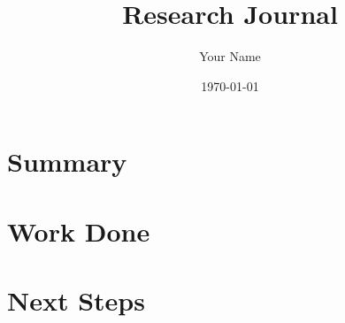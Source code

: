 \documentclass{article}
\begin{document}
\title{Research Journal}
\author{Your Name}
\date{\today}

\maketitle

\section{Summary}

\section{Work Done}

\section{Next Steps}
\end{document}
